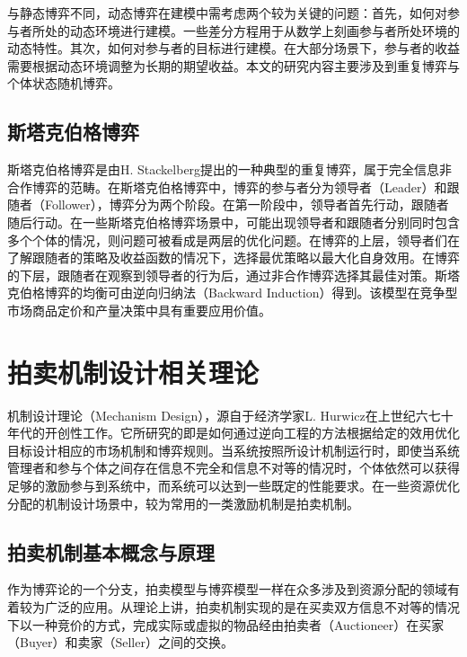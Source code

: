 与静态博弈不同，动态博弈在建模中需考虑两个较为关键的问题：首先，如何对参与者所处的动态环境进行建模。一些差分方程用于从数学上刻画参与者所处环境的动态特性。其次，如何对参与者的目标进行建模。在大部分场景下，参与者的收益需要根据动态环境调整为长期的期望收益。本文的研究内容主要涉及到重复博弈与个体状态随机博弈。

\subsection{斯塔克伯格博弈}
斯塔克伯格博弈是由H. Stackelberg提出的一种典型的重复博弈，属于完全信息非合作博弈的范畴。在斯塔克伯格博弈中，博弈的参与者分为领导者（Leader）和跟随者（Follower），博弈分为两个阶段。在第一阶段中，领导者首先行动，跟随者随后行动。在一些斯塔克伯格博弈场景中，可能出现领导者和跟随者分别同时包含多个个体的情况，则问题可被看成是两层的优化问题。在博弈的上层，领导者们在了解跟随者的策略及收益函数的情况下，选择最优策略以最大化自身效用。在博弈的下层，跟随者在观察到领导者的行为后，通过非合作博弈选择其最佳对策。斯塔克伯格博弈的均衡可由逆向归纳法（Backward Induction）得到。该模型在竞争型市场商品定价和产量决策中具有重要应用价值。

%
%
%


\section{拍卖机制设计相关理论}\label{sec:mech}

机制设计理论（Mechanism Design），源自于经济学家L. Hurwicz在上世纪六七十年代的开创性工作。它所研究的即是如何通过逆向工程的方法根据给定的效用优化目标设计相应的市场机制和博弈规则\cite{Nisan07}。当系统按照所设计机制运行时，即使当系统管理者和参与个体之间存在信息不完全和信息不对等的情况时，个体依然可以获得足够的激励参与到系统中，而系统可以达到一些既定的性能要求。在一些资源优化分配的机制设计场景中，较为常用的一类激励机制是拍卖机制。

\subsection{拍卖机制基本概念与原理}
作为博弈论的一个分支，拍卖模型与博弈模型一样在众多涉及到资源分配的领域有着较为广泛的应用。从理论上讲，拍卖机制实现的是在买卖双方信息不对等的情况下以一种竞价的方式，完成实际或虚拟的物品经由拍卖者（Auctioneer）在买家（Buyer）和卖家（Seller）之间的交换\cite{Nisan07}。

